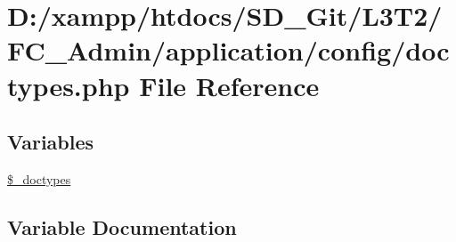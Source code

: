 \hypertarget{doctypes_8php}{}\section{D\+:/xampp/htdocs/\+S\+D\+\_\+\+Git/\+L3\+T2/\+F\+C\+\_\+\+Admin/application/config/doctypes.php File Reference}
\label{doctypes_8php}
\subsection*{Variables}
\begin{DoxyCompactItemize}
\item 
\hyperlink{doctypes_8php_aae4e5521057605d22a78c29c7d4ad7de}{\$\+\_\+doctypes}
\end{DoxyCompactItemize}


\subsection{Variable Documentation}
\hypertarget{doctypes_8php_aae4e5521057605d22a78c29c7d4ad7de}{}
